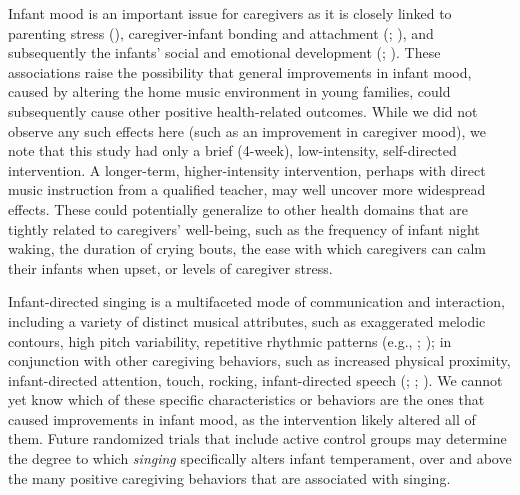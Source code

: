 \documentclass[
]{article}
\begin{document}
Infant mood is an important issue for caregivers as it is closely linked
to parenting stress (),
caregiver-infant bonding and attachment (; ), and
subsequently the infants' social and emotional development
(;
). These associations raise
the possibility that general improvements in infant mood, caused by
altering the home music environment in young families, could
subsequently cause other positive health-related outcomes. While we did
not observe any such effects here (such as an improvement in caregiver
mood), we note that this study had only a brief (4-week), low-intensity,
self-directed intervention. A longer-term, higher-intensity
intervention, perhaps with direct music instruction from a qualified
teacher, may well uncover more widespread effects. These could
potentially generalize to other health domains that are tightly related
to caregivers' well-being, such as the frequency of infant night waking,
the duration of crying bouts, the ease with which caregivers can calm
their infants when upset, or levels of caregiver stress.

Infant-directed singing is a multifaceted mode of communication and
interaction, including a variety of distinct musical attributes, such as
exaggerated melodic contours, high pitch variability, repetitive
rhythmic patterns (e.g., ; ); in
conjunction with other caregiving behaviors, such as increased physical
proximity, infant-directed attention, touch, rocking, infant-directed
speech (;
;
). We cannot
yet know which of these specific characteristics or behaviors are the
ones that caused improvements in infant mood, as the intervention likely
altered all of them. Future randomized trials that include active
control groups may determine the degree to which \emph{singing}
specifically alters infant temperament, over and above the many positive
caregiving behaviors that are associated with singing.
\end{document}
